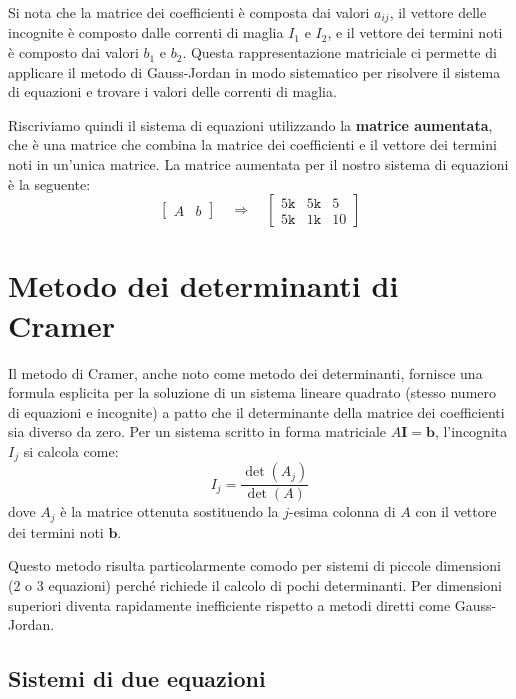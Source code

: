 Si nota che la matrice dei coefficienti è composta dai valori $a_{ij}$, il vettore delle incognite è composto dalle correnti di maglia $I_1$ e $I_2$, e il vettore dei termini noti è composto dai valori $b_1$ e $b_2$. Questa rappresentazione matriciale ci permette di applicare il metodo di Gauss-Jordan in modo sistematico per risolvere il sistema di equazioni e trovare i valori delle correnti di maglia.

Riscriviamo quindi il sistema di equazioni utilizzando la \textbf{matrice aumentata}, che è una matrice che combina la matrice dei coefficienti e il vettore dei termini noti in un'unica matrice. La matrice aumentata per il nostro sistema di equazioni è la seguente:
\begin{equation}
\left[
\begin{array}{c|c}
	A & b
\end{array}
\right] \quad \Rightarrow \quad	
\left[
\begin{array}{cc|c}
5\texttt{k} & 5\texttt{k} & 5 \\
5\texttt{k} & 1\texttt{k} & 10
\end{array}
\right]
\end{equation}

\section{Metodo dei determinanti di Cramer}

Il metodo di Cramer, anche noto come metodo dei determinanti, fornisce una formula esplicita per la soluzione di un sistema lineare quadrato (stesso numero di equazioni e incognite) a patto che il determinante della matrice dei coefficienti sia diverso da zero. Per un sistema scritto in forma matriciale \(A \mathbf{I} = \mathbf{b}\), l'incognita \(I_j\) si calcola come:
\begin{equation}
I_j = \frac{\det(A_j)}{\det(A)}
\label{eq:cramer_formula}
\end{equation}
dove \(A_j\) è la matrice ottenuta sostituendo la \(j\)-esima colonna di \(A\) con il vettore dei termini noti \(\mathbf{b}\).

Questo metodo risulta particolarmente comodo per sistemi di piccole dimensioni (2 o 3 equazioni) perché richiede il calcolo di pochi determinanti. Per dimensioni superiori diventa rapidamente inefficiente rispetto a metodi diretti come Gauss-Jordan.

\subsection{Sistemi di due equazioni}


